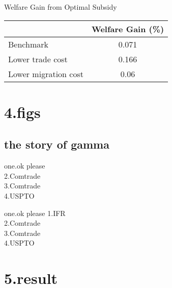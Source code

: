 \documentclass[compress]{beamer}
\begin{document}
	
	\begin{frame}{Welfare Gain from Optimal Subsidy}
		\begin{table}[htbp]\centering
			\begin{tabular}{l*{1}{c}}
				\hline\hline
				
				&\multicolumn{1}{c}{Welfare Gain (\%)}\\
				\hline
				Benchmark &0.071 \\ [0.5em]
				Lower trade cost &0.166 \\[0.5em]
				Lower migration cost &0.06  \\[0.5em]
				\hline
			\end{tabular}
		\end{table}
	\end{frame}
	
	
	
	
	
	\section{4.figs}
	
	\subsection{the story of gamma}
	\begin{frame}
		
		\begin{block}{\small one.ok please}\scriptsize
			 \\
			2.Comtrade\\
			3.Comtrade \\
			4.USPTO\\
		\end{block}
		\begin{block}{\small one.ok please}\scriptsize
			1.IFR\\
			2.Comtrade\\
			3.Comtrade \\
			4.USPTO\\
		\end{block}
	\end{frame}
	
	\begin{frame}
	\end{frame}
	
	
	\section{5.result}
	
\end{document}
